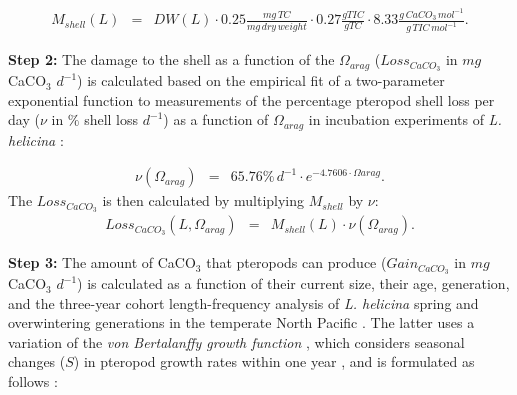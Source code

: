 {\scriptsize
\begin{eqnarray}
M_{shell}(L) & = & DW(L) \cdot 0.25\frac{mg\, TC}{mg\, dry \, weight} \cdot 0.27\frac{gTIC}{gTC} \cdot 8.33\frac{g\, CaCO_3 \,mol^{-1}}{g\, TIC\, mol^{-1}}. \label{eq:mass_shell}
\end{eqnarray}} 

\textbf{Step 2:} The damage to the shell as a function of the $\Omega_{arag}$ ($Loss_{CaCO_3}$ in $mg$ CaCO$_3$ $d^{-1}$) is calculated based on the empirical fit of a two-parameter exponential function to measurements of the percentage  pteropod shell loss per day ($\nu$ in $\%$ shell loss $d^{-1}$) as a function of $\Omega_{arag}$ in incubation experiments of \textit{L. helicina} \citep{Bednarsek2014CalcificationDissolution}:

{\scriptsize
\begin{eqnarray}
\nu(\Omega_{arag}) & = & 65.76\% \, d^{-1} \cdot e^{-4.7606 \cdot \Omega{arag}}.
\end{eqnarray}}
The $Loss_{CaCO_3}$ is then calculated by multiplying $M_{shell}$ by $\nu$:
{\scriptsize
\begin{eqnarray}
Loss_{CaCO_3}(L,\Omega_{arag}) & = & M_{shell}(L) \cdot \nu(\Omega_{arag}) .
\end{eqnarray}}

\textbf{Step 3:} The amount of CaCO$_3$ that pteropods can produce ($Gain_{CaCO_3}$ in $mg$ CaCO$_3$ $d^{-1}$) is calculated as a function of their current size, their age, generation, and the three-year cohort length-frequency analysis of \textit{L. helicina} spring and overwintering generations in the temperate North Pacific \citep[Fig. \ref{fig:optimal_growth}; ][]{Wang2017Lifecycle}. The latter uses a variation of the \textit{von Bertalanffy growth function} \citep[VBGF; ][]{Bertalanffy1938}, which considers seasonal changes ($S$) in pteropod growth rates within one year \citep[][]{Wang2017Lifecycle}, and is formulated as follows \citep{Somers1988,GarciaBerthou2012Growth,pauly2013ELEFAN}:

